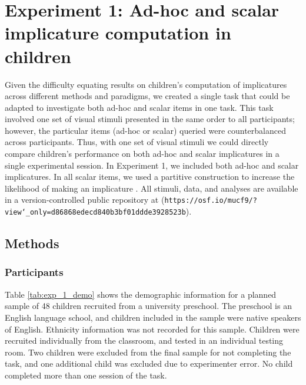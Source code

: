 \documentclass[man]{apa2}
\begin{document}
\section{Experiment 1: Ad-hoc and scalar implicature computation in children}

Given the difficulty equating results on children's computation of implicatures across different methods and paradigms, we created a single task that could be adapted to investigate both ad-hoc and scalar items in one task. This task involved one set of visual stimuli presented in the same order to all participants; however, the particular items (ad-hoc or scalar) queried were counterbalanced across participants. Thus, with one set of visual stimuli we could directly compare children's performance on both ad-hoc and scalar implicatures in a single experimental session. In Experiment 1, we included both ad-hoc and scalar implicatures. In all scalar items, we used a partitive construction to increase the likelihood of making an implicature . All stimuli, data, and analyses are available in a version-controlled public repository at ({\tt{https://osf.io/mucf9/?view\char`_only=d86868edecd840b3bf01ddde3928523b}}).


\subsection{Methods}

\subsubsection{Participants}

Table \ref{tab:exp_1_demo} shows the demographic information for a planned sample of 48 children recruited from a university preschool. The preschool is an English language school, and children included in the sample were native speakers of English. Ethnicity information was not recorded for this sample. Children were recruited individually from the classroom, and tested in an individual testing room. Two children were excluded from the final sample for not completing the task, and one additional child was excluded due to experimenter error. No child completed more than one session of the task.
\end{document}
